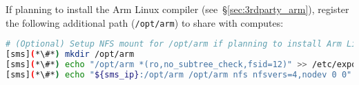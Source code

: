 \noindent If planning to install the Arm Linux compiler
(see~\S\ref{sec:3rdparty_arm}), register the
following additional path (\texttt{/opt/arm}) to share with computes:
\begin{lstlisting}[language=bash,keywords={},upquote=true,keepspaces]
# (Optional) Setup NFS mount for /opt/arm if planning to install Arm Linux compiler packages
[sms](*\#*) mkdir /opt/arm
[sms](*\#*) echo "/opt/arm *(ro,no_subtree_check,fsid=12)" >> /etc/exports
[sms](*\#*) echo "${sms_ip}:/opt/arm /opt/arm nfs nfsvers=4,nodev 0 0" >> $CHROOT/etc/fstab
\end{lstlisting}
